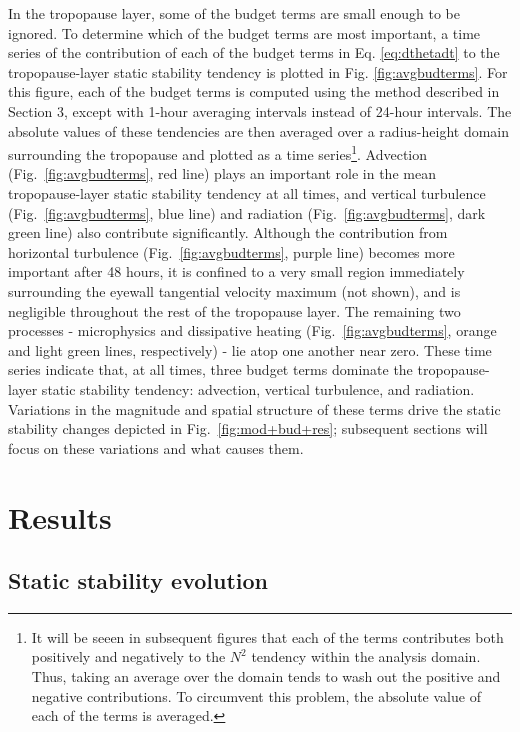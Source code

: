 \documentclass{ametsoc}
\begin{document}
In the tropopause layer, some of the budget terms are small enough to be ignored.
To determine which of the budget terms are most important, a time series of the contribution of each of the budget terms in Eq. \ref{eq:dthetadt} to the tropopause-layer static stability tendency is plotted in Fig. \ref{fig:avgbudterms}.
For this figure, each of the budget terms is computed using the method described in Section 3, except with 1-hour averaging intervals instead of 24-hour intervals.
The absolute values of these tendencies are then averaged over a radius-height domain surrounding the tropopause and plotted as a time series\footnote{It will be seeen in subsequent figures that each of the terms contributes both positively and negatively to the $N^2$ tendency within the analysis domain. 
Thus, taking an average over the domain tends to wash out the positive and negative contributions.
To circumvent this problem, the absolute value of each of the terms is averaged.}. 
Advection (Fig.~\ref{fig:avgbudterms}, red line) plays an important role in the mean tropopause-layer static stability tendency at all times, and vertical turbulence (Fig.~\ref{fig:avgbudterms}, blue line) and radiation (Fig.~\ref{fig:avgbudterms}, dark green line) also contribute significantly. %
Although the contribution from horizontal turbulence (Fig.~\ref{fig:avgbudterms}, purple line) becomes more important after 48 hours, it is confined to a very small region immediately surrounding the eyewall tangential velocity maximum (not shown), and is negligible throughout the rest of the tropopause layer.
The remaining two processes - microphysics and dissipative heating (Fig.~\ref{fig:avgbudterms}, orange and light green lines, respectively) - lie atop one another near zero.
These time series indicate that, at all times, three budget terms dominate the tropopause-layer static stability tendency: advection, vertical turbulence, and radiation.
Variations in the magnitude and spatial structure of these terms drive the static stability changes depicted in Fig.~\ref{fig:mod+bud+res}; subsequent sections will focus on these variations and what causes them.

 \section{Results}

 \subsection{Static stability evolution}
\end{document}
